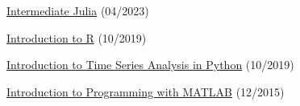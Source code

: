 \begin{cventries}
{\begin{cvitems}
            \item{\href{https://www.datacamp.com/statement-of-accomplishment/course/930a810eaf9c88d856429bfabf33cb9df57e2046}{Intermediate Julia} (04/2023)}
            \item{\href{https://www.datacamp.com/statement-of-accomplishment/course/dd5746b9564cf374bcc0bb379e1801925e25259e}{Introduction to R} (10/2019)}
            \item{\href{https://www.datacamp.com/statement-of-accomplishment/course/807548ea866063da3c0083afcebf3be48d44f277}{Introduction to Time Series Analysis in Python} (10/2019)}
            \item {\href{https://www.coursera.org/account/accomplishments/verify/9G7V69L6QP}{Introduction to Programming with MATLAB} (12/2015)}
        \end{cvitems}      
    }

\end{cventries}

